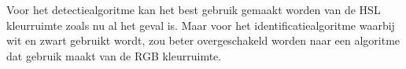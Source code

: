 Voor het detectiealgoritme kan het best gebruik gemaakt worden van de HSL kleurruimte zoals nu al het geval is. Maar voor het identificatiealgoritme waarbij wit en zwart gebruikt wordt, zou beter overgeschakeld worden naar een algoritme dat gebruik maakt van de RGB kleurruimte.